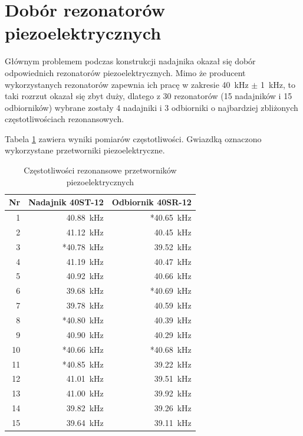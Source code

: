 \section{Dobór rezonatorów piezoelektrycznych}

Głównym problemem podczas konstrukcji nadajnika okazał się dobór odpowiednich rezonatorów piezoelektrycznych.
Mimo że producent wykorzystanych rezonatorów zapewnia ich pracę w zakresie \SI{40}{kHz} $\pm$ \SI{1}{kHz},
to taki rozrzut okazał się zbyt duży, 
dlatego z 30 rezonatorów (15 nadajników i 15 odbiorników) wybrane zostały 4 nadajniki i 3 odbiorniki o najbardziej 
zbliżonych częstotliwościach rezonansowych.

Tabela \ref{table:czestotliwosci} zawiera wyniki pomiarów częstotliwości. Gwiazdką oznaczono wykorzystane przetworniki piezoelektryczne.

\begin{table}[h]
  \caption{Częstotliwości rezonansowe przetworników piezoelektrycznych}
  \label{table:czestotliwosci}
  \centering
  \begin{tabular}{|r|r|r|}
    \hline 
    Nr & Nadajnik 40ST-12 & Odbiornik 40SR-12\\
    \hline
    1  &   \SI{40,88}{kHz} & *\SI{40,65}{kHz} \\
    2  &   \SI{41,12}{kHz} &  \SI{40,45}{kHz} \\
    3  &  *\SI{40,78}{kHz} &  \SI{39,52}{kHz} \\
    4  &   \SI{41,19}{kHz} &  \SI{40,47}{kHz} \\
    5  &   \SI{40,92}{kHz} &  \SI{40,66}{kHz} \\
    6  &   \SI{39,68}{kHz} & *\SI{40,69}{kHz} \\
    7  &   \SI{39,78}{kHz} &  \SI{40,59}{kHz} \\
    8  &  *\SI{40,80}{kHz} &  \SI{40,39}{kHz} \\
    9  &   \SI{40,90}{kHz} &  \SI{40,29}{kHz} \\
    10 &  *\SI{40,66}{kHz} & *\SI{40,68}{kHz} \\
    11 &  *\SI{40,85}{kHz} &  \SI{39,22}{kHz} \\
    12 &   \SI{41,01}{kHz} &  \SI{39,51}{kHz} \\
    13 &   \SI{41,00}{kHz} &  \SI{39,92}{kHz} \\
    14 &   \SI{39,82}{kHz} &  \SI{39,26}{kHz} \\
    15 &   \SI{39,64}{kHz} &  \SI{39,11}{kHz} \\
    \hline
  \end{tabular}
\end{table}


